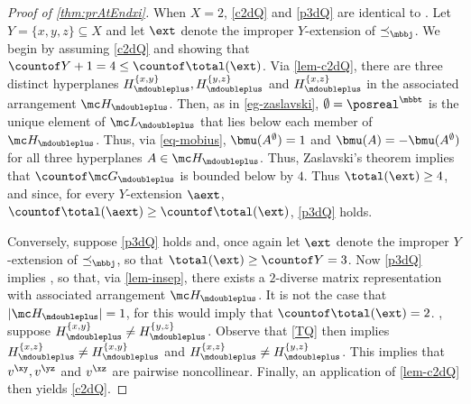 \label{proofsection:prAtEndxi}\begin{proof}[Proof of \autoref{thm:prAtEndxi}]\label{proof:prAtEndxi}\label {proof-prop-c2dQ} When $X=2$, \ref {c2dQ} and \ref {p3dQ} are identical to \twodiv . Let $ Y = \{ x, y , z \} \subseteq X$ and let $\ext $ denote the improper $Y$-extension of $\preceq _{\mbbj }$. We begin by assuming \ref {c2dQ} and showing that $\countof Y + 1 = 4 \leq \countof \total ( \ext )$. Via \cref {lem-c2dQ}, there are three distinct hyperplanes $H_{\mdoubleplus }^{\{x,y\}}, H_{\mdoubleplus }^{\{y,z\}}$ and $H_{\mdoubleplus }^{\{x,z\}}$ in the associated arrangement $\mc H_{\mdoubleplus }$. Then, as in \cref {eg-zaslavski}, $\emptyset = \posreal ^{\mbbt }$ is the unique element of $\mc L_{\mdoubleplus }$ that lies below each member of $\mc H_{\mdoubleplus }$. Thus, via \cref {eq-mobius}, $\bmu (A^{\emptyset }) = 1 $ and $\bmu (A) = - \bmu (A^{\emptyset })$ for all three hyperplanes $A \in \mc H_{\mdoubleplus }$. Thus, Zaslavski's theorem implies that $\countof \mc G_{\mdoubleplus }$ is bounded below by $4$. Thus $\total (\ext ) \geq 4$, and since, for every $Y$-extension $\aext $, $\countof \total (\aext ) \geq \countof \total (\ext )$, \ref {p3dQ} holds. \par Conversely, suppose \ref {p3dQ} holds and, once again let $\ext $ denote the improper $Y$-extension of $\preceq _{\mbbj }$, so that $\total (\ext ) \geq \countof Y = 3$. Now \ref {p3dQ} implies \twodiv , so that, via \cref {lem-insep}, there exists a $2$-diverse matrix representation with associated arrangement $\mc H_{\mdoubleplus }$. It is not the case that $\lvert \mc H_{\mdoubleplus } \rvert = 1$, for this would imply that $\countof \total (\ext ) = 2$. \Wlog , suppose $H_{\mdoubleplus }^{\{x,y\}} \neq H_{\mdoubleplus }^{\{y,z\}}$. Observe that \ref {TQ} then implies $H_{\mdoubleplus }^{\{x,z\}} \neq H_{\mdoubleplus }^{\{x,y\}}$ and $H_{\mdoubleplus }^{\{x,z\}} \neq H_{\mdoubleplus }^{\{y,z\}}$. This implies that $v^{\xy }, v^{\yz } $ and $v^{\xz }$ are pairwise noncollinear. Finally, an application of \cref {lem-c2dQ} then yields \ref {c2dQ}.\end{proof}
